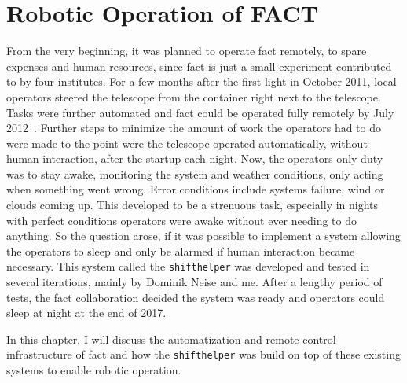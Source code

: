 \chapter{Robotic Operation of FACT}\label{chp:shifthelper}

From the very beginning, it was planned to operate \gls{fact} remotely,
to spare expenses and human resources,
since \gls{fact} is just a small experiment contributed to by four institutes.
For a few months after the first light in October 2011,
local operators steered the telescope from the container right next to the telescope.
Tasks were further automated and \gls{fact} could be operated fully remotely by July 2012~\cite{fact-design-operation}.
Further steps to minimize the amount of work the operators had to do were
made to the point were the telescope operated automatically,
without human interaction, after the startup each night.
Now, the operators only duty was to stay awake, monitoring the system and weather
conditions, only acting when something went wrong.
Error conditions include systems failure, wind or clouds coming up.
This developed to be a strenuous task, especially in nights with perfect conditions
operators were awake without ever needing to do anything.
So the question arose, if it was possible to implement a system allowing
the operators to sleep and only be alarmed if human interaction became necessary.
This system called the \texttt{shifthelper} was developed and tested in several iterations,
mainly by Dominik Neise and me.
After a lengthy period of tests, the \gls{fact} collaboration decided the system
was ready and operators could sleep at night at the end of 2017.

In this chapter, I will discuss the automatization and remote control infrastructure
of \gls{fact} and how the \texttt{shifthelper} was build on top of these
existing systems to enable robotic operation.

